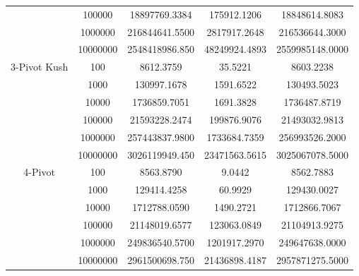 \documentclass{article}
\begin{document}
\begin{center}
\begin{tabular}{ |c c | c c c| }
                        & 100000   & 18897769.3384  & 175912.1206   & 18848614.8083 \\
                        & 1000000  & 216844641.5500 & 2817917.2648  & 216536644.3000 \\
                        & 10000000 & 2548418986.850 & 48249924.4893 & 2559985148.0000 \\
        \hline
        3-Pivot Kush    & 100      & 8612.3759      & 35.5221       & 8603.2238 \\
                        & 1000     & 130997.1678    & 1591.6522     & 130493.5023 \\
                        & 10000    & 1736859.7051   & 1691.3828     & 1736487.8719 \\
                        & 100000   & 21593228.2474  & 199876.9076   & 21493032.9813 \\
                        & 1000000  & 257443837.9800 & 1733684.7359  & 256993526.2000 \\
                        & 10000000 & 3026119949.450 & 23471563.5615 & 3025067078.5000 \\
        \hline
        4-Pivot         & 100      & 8563.8790      & 9.0442        & 8562.7883 \\
                        & 1000     & 129414.4258    & 60.9929       & 129430.0027 \\
                        & 10000    & 1712788.0590   & 1490.2721     & 1712866.7067 \\
                        & 100000   & 21148019.6577  & 123063.0849   & 21104913.9275 \\
                        & 1000000  & 249836540.5700 & 1201917.2970  & 249647638.0000 \\
                        & 10000000 & 2961500698.750 & 21436898.4187 & 2957871275.5000 \\
        \hline
    \end{tabular}


\end{center}
\end{document}
